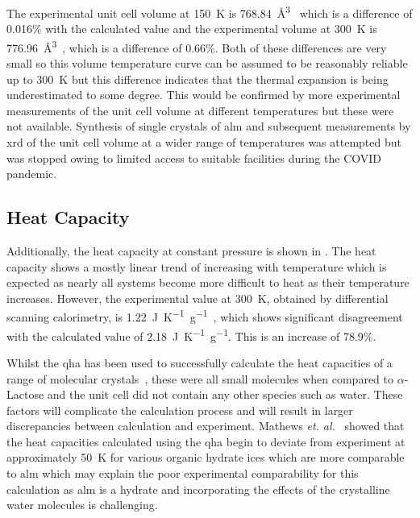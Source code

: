 The experimental unit cell volume at \SI{150}{K} is \SI{768.84}{\angstrom^3}~\cite{Smith2005} which is a difference of 0.016\% with the calculated value and the experimental volume at \SI{300}{K} is \SI{776.96}{\angstrom^3}~\cite{Schreyer2014}, which is a difference of 0.66\%. Both of these differences are very small so this volume temperature curve can be assumed to be reasonably reliable up to \SI{300}{K} but this difference indicates that the thermal expansion is being underestimated to some degree. This would be confirmed by more experimental measurements of the unit cell volume at different temperatures but these were not available. Synthesis of single crystals of \acrshort{alm} and subsequent measurements by \acrshort{xrd} of the unit cell volume at a wider range of temperatures was attempted but was stopped owing to limited access to suitable facilities during the COVID pandemic.

\subsection{Heat Capacity}
Additionally, the heat capacity at constant pressure is shown in . The heat capacity shows a mostly linear trend of increasing with temperature which is expected as nearly all systems become more difficult to heat as their temperature increases. However, the experimental value at \SI{300}{K}, obtained by differential scanning calorimetry, is \SI{1.22}{J K^{-1} g^{-1}}~\cite{Kawaizumi1981}, which shows significant disagreement with the calculated value of \SI{2.18}{J K^{-1} g^{-1}}. This is an increase of 78.9\%. 

Whilst the \acrshort{qha} has been used to successfully calculate the heat capacities of a range of molecular crystals~\cite{Cervinka2016}, these were all small molecules when compared to \(\alpha\)\nobreakdash-Lactose and the unit cell did not contain any other species such as water. These factors will complicate the calculation process and will result in larger discrepancies between calculation and experiment. Mathews \textit{et. al.}~\cite{Mathews2020} showed that the heat capacities calculated using the \acrshort{qha} begin to deviate from experiment at approximately \SI{50}{K} for various organic hydrate ices which are more comparable to \acrshort{alm} which may explain the poor experimental comparability for this calculation as \acrshort{alm} is a hydrate and incorporating the effects of the crystalline water molecules is challenging. 

